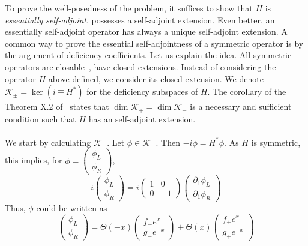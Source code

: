 To prove the well-posedness of the problem, it suffices to show that $H$ is \textit{essentially self-adjoint}, \ie possesses a self-adjoint extension.
Even better, an essentially self-adjoint operator has always a unique self-adjoint extension.
A common way to prove the essential self-adjointness of a symmetric operator is by the argument of deficiency coefficients.
Let us explain the idea.
All symmetric operators are closable~\cite{Reed1981}, 
\ie
have closed extensions.
Instead of considering the operator $H$ above-defined, 
we consider its closed extension.
We denote  $\mathcal{K}_{\pm} = \ker (i \mp H^*)$ for the deficiency subspaces of $H$. 
The corollary of the Theorem X.2 of~\cite{Reed1975} states that $\dim \mathcal{K}_+ = \dim \mathcal{K}_-$ is a necessary and sufficient condition such that $H$ has an self-adjoint extension. \\\\
We start by calculating $\mathcal{K}_-$. Let $\phi \in \mathcal{K}_-$. Then $- i \phi = H^* \phi$. As $H$ is symmetric, this implies, for $\phi = \begin{pmatrix} \phi_L \\  \phi_R \end{pmatrix}$, 
\begin{equation}
i \begin{pmatrix} \phi_L \\ \phi_R \end{pmatrix} = 
i \begin{pmatrix} 1 & 0  \\ 0  &  -1 \end{pmatrix} 
\begin{pmatrix} \partial_1 \phi_L  \\  \partial_1\phi_R \end{pmatrix}
\end{equation} 
Thus, $\phi$ could be written as
\begin{equation}
\begin{pmatrix} \phi_L \\ \phi_R \end{pmatrix} = 
\Theta(-x) \begin{pmatrix} f_- e^x  \\ g_-  e^{-x} \end{pmatrix} + 
\Theta(x) \begin{pmatrix} f_+ e^x  \\ g_+  e^{-x} \end{pmatrix}
\end{equation}
